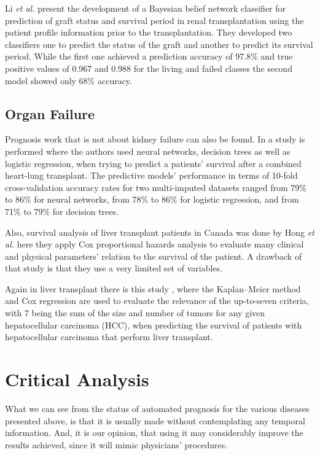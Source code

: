 Li \emph{et al.} \cite{Li2010} present the development of a Bayesian belief network classifier for prediction of graft status and 
survival period in renal transplantation using the patient profile information prior to the transplantation. They developed two
 classifiers one to predict the status of the graft and another to predict its survival period. While the first one achieved a prediction
 accuracy of 97.8\% and true positive values of 0.967 and 0.988 for the living and failed classes the second model showed only 68\% accuracy.
 
 \subsection{Organ Failure}
 \label{subsection:organ}
 
 Prognosis work that is not about kidney failure can also be found. In \cite{Oztekin2009} a study is performed where the authors
 used neural networks, decision trees as well as logistic regression, when trying to predict a patients’ survival after a combined heart-lung
 transplant. The predictive models’ performance in terms of 10-fold cross-validation accuracy rates for two multi-imputed datasets ranged 
 from 79\% to 86\% for neural networks, from 78\% to 86\% for logistic regression, and from 71\% to 79\% for decision trees.

Also, survival analysis of liver transplant patients in Canada was done by Hong \emph{et al.} \cite{Hong2006} here they apply Cox proportional 
hazards analysis to evaluate many clinical and physical parameters’ relation to the survival of the patient. A drawback of that study is that
 they use a very limited set of variables.

Again in liver transplant there is this study \cite{Ataide2012}, where the Kaplan–Meier method and Cox regression are used to evaluate
 the relevance of the up-to-seven criteria, with 7 being the sum of the size and number of tumors for any given hepatocellular carcinoma (HCC),
 when predicting the survival of patients with hepatocellular carcinoma that perform liver transplant. 

 \section{Critical Analysis}
 \label{section:analysis}
 
 What we can see from the status of automated prognosis for the various diseases presented above, is that it is usually made without 
 contemplating any temporal information. And, it is our opinion, that using it may considerably improve the results achieved, since it
 will mimic physicians’ procedures. 

